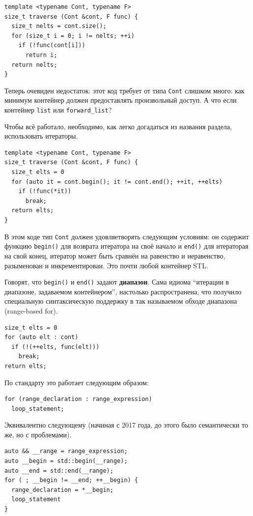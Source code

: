 \documentclass[a4paper,12pt,oneside]{book}
\begin{document}
\begin{lstlisting}
template <typename Cont, typename F>
size_t traverse (Cont &cont, F func) {
  size_t nelts = cont.size();
  for (size_t i = 0; i != nelts; ++i)
    if (!func(cont[i]))
      return i;
  return nelts;
}
\end{lstlisting}

Теперь очевиден недостаток: этот код требует от типа \lstinline!Cont! слишком много: как минимум контейнер должен предоставлять произвольный доступ. А что если контейнер \lstinline!list! или \lstinline!forward_list!?

Чтобы всё работало, необходимо, как легко догадаться из названия раздела, использовать итераторы.

\begin{lstlisting}
template <typename Cont, typename F>
size_t traverse (Cont &cont, F func) {
  size_t elts = 0
  for (auto it = cont.begin(); it != cont.end(); ++it, ++elts)
    if (!func(*it))
      break;
  return elts;
}
\end{lstlisting}

В этом коде тип \lstinline!Cont! должен удовляетворять следующим условиям: он содержит функцию \lstinline!begin()! для возврата итератора на своё начало и \lstinline!end()! для итераторая на свой конец, итератор может быть сравнён на равенство и неравенство, разыменован и инкрементирован. Это почти любой контейнер STL.

Говорят, что \lstinline!begin()! и \lstinline!end()! задают \textbf{диапазон}. Сама идиома ``итерации в диапазоне, задаваемом контейнером'', настолько распространена, что получило специальную синтаксическую поддержку в так называемом обходе диапазона (range-based for).

\begin{lstlisting}
size_t elts = 0
for (auto elt : cont)
  if (!(++elts, func(elt)))
    break;
return elts;
\end{lstlisting}

По стандарту это работает следующим образом:

\begin{lstlisting}
for (range_declaration : range_expression)
  loop_statement;
\end{lstlisting}

Эквивалентно следующему (начиная с 2017 года, до этого было семантически то же, но с проблемами).

\begin{lstlisting}
auto && __range = range_expression; 
auto __begin = std::begin(__range);
auto __end = std::end(__range);
for ( ; __begin != __end; ++__begin) {
  range_declaration = *__begin;
  loop_statement
} 
\end{lstlisting}
\end{document}
